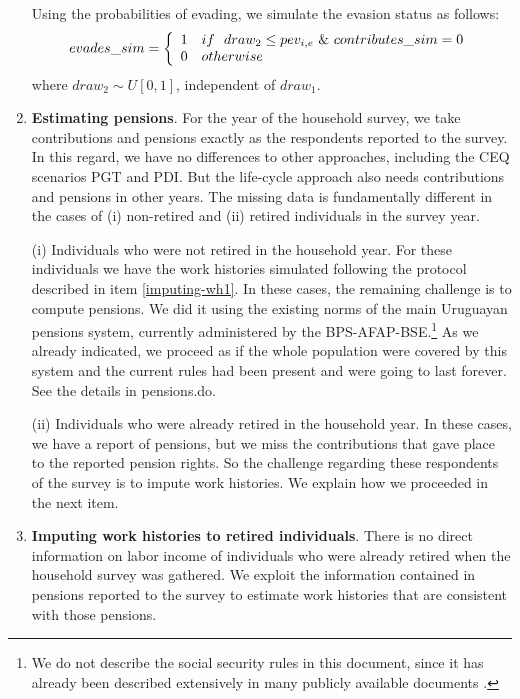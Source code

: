 \documentclass{article}
\begin{document}
\begin{enumerate}
Using the probabilities of evading, we simulate the evasion status as follows:
\begin{equation}
        evades\_sim = \left \{ \begin{array}{ll}
         1 & if \ \ draw_2 \leq pev_{i,e} \ \& \ contributes\_sim = 0 \\
         0 & otherwise 
            \end{array} \right .\\
\end{equation}
where $draw_2 \sim U[0,1]$, independent of $draw_1$.



\item \label{item:pensions} \textbf{Estimating pensions}. For the year of the household survey, we take contributions and pensions exactly as the respondents reported to the survey. In this regard, we have no differences to other approaches, including the CEQ scenarios PGT and PDI. But the life-cycle approach also needs contributions and pensions in other years. The missing data is fundamentally different in the cases of (i) non-retired and (ii) retired individuals in the survey year.

(i) Individuals who were not retired in the household year. For these individuals we have the work histories simulated following the protocol described in item \ref{imputing-wh1}. In these cases, the remaining challenge is to compute pensions. We did it using the existing norms of the main Uruguayan pensions system, currently administered by the BPS-AFAP-BSE.\footnote{We do not describe the social security rules in this document, since it has already been described extensively in many publicly available documents \parencite{Forteza2012, Forteza2013a,  Saldain1995}.} As we already indicated, we proceed as if the whole population were covered by this system and the current rules had been present and were going to last forever. See the details in pensions.do. 

(ii) Individuals who were already retired in the household year. In these cases, we have a report of pensions, but we miss the contributions that gave place to the reported pension rights. So the challenge regarding these respondents of the survey is to impute work histories. We explain how we proceeded in the next item. 

    
\item \textbf{Imputing work histories to retired individuals}. \label{imputing-wh2} There is no direct information on labor income of individuals who were already retired when the household survey was gathered. We exploit the information contained in pensions reported to the survey to estimate work histories that are consistent with those pensions.


\end{enumerate}
\end{document}
